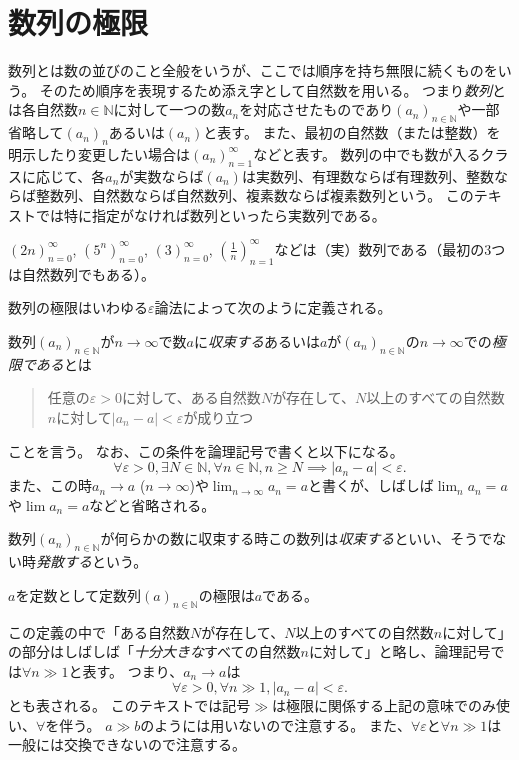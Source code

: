 \section{数列の極限}

数列とは数の並びのこと全般をいうが、ここでは順序を持ち無限に続くものをいう。
そのため順序を表現するため添え字として自然数を用いる。
つまり\emph{数列}とは各自然数$n \in \mathbb{N}$に対して一つの数$a_n$を対応させたものであり$(a_n)_{n \in \mathbb{N}}$や一部省略して$(a_n)_n$あるいは$(a_n)$と表す。
また、最初の自然数（または整数）を明示したり変更したい場合は$(a_n)_{n = 1}^\infty$などと表す。
数列の中でも数が入るクラスに応じて、各$a_n$が実数ならば$(a_n)$は実数列、有理数ならば有理数列、整数ならば整数列、自然数ならば自然数列、複素数ならば複素数列という。
このテキストでは特に指定がなければ数列といったら実数列である。

\begin{example}
$(2 n)_{n = 0}^\infty$, $(5^n)_{n = 0}^\infty$, $(3)_{n = 0}^\infty$, $(\frac{1}{n})_{n = 1}^\infty$などは（実）数列である（最初の3つは自然数列でもある）。
\end{example}

数列の極限はいわゆる$\varepsilon$論法によって次のように定義される。

\begin{definition}[数列の極限]
数列$(a_n)_{n \in \mathbb{N}}$が$n \to \infty$で数$a$に\emph{収束する}あるいは$a$が$(a_n)_{n \in \mathbb{N}}$の$n \to \infty$での\emph{極限である}とは
\begin{quote}
任意の$\varepsilon > 0$に対して、ある自然数$N$が存在して、$N$以上のすべての自然数$n$に対して$|a_n-a| < \varepsilon$が成り立つ
\end{quote}
ことを言う。
なお、この条件を論理記号で書くと以下になる。
$$
\forall \varepsilon > 0, \exists N \in \mathbb{N}, \forall n \in \mathbb{N}, n \ge N \implies |a_n-a| < \varepsilon.
$$
また、この時$a_n \to a$ ($n \to \infty$)や$\lim_{n \to \infty}a_n = a$と書くが、しばしば$\lim_n a_n = a$や$\lim a_n = a$などと省略される。

数列$(a_n)_{n \in \mathbb{N}}$が何らかの数に収束する時この数列は\emph{収束する}といい、そうでない時\emph{発散する}という。
\end{definition}

\begin{example}
$a$を定数として定数列$(a)_{n \in \mathbb{N}}$の極限は$a$である。
\end{example}

この定義の中で「ある自然数$N$が存在して、$N$以上のすべての自然数$n$に対して」の部分はしばしば「\emph{十分大きな}すべての自然数$n$に対して」と略し、論理記号では$\forall n \gg 1$と表す。
つまり、$a_n \to a$は
$$
\forall \varepsilon > 0, \forall n \gg 1, |a_n-a| < \varepsilon.
$$
とも表される。
このテキストでは記号$\gg$は極限に関係する上記の意味でのみ使い、$\forall$を伴う。
$a \gg b$のようには用いないので注意する。
また、$\forall \varepsilon$と$\forall n \gg 1$は一般には交換できないので注意する。

